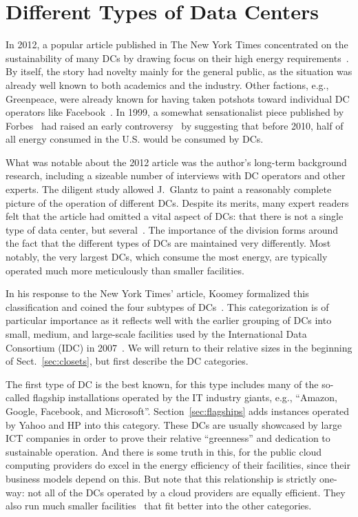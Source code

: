 \documentclass[officiallayout]{tktla}
\begin{document}
\section{Different Types of Data Centers}
\label{sec:types}

In 2012, a popular article published in The New York Times concentrated on the
sustainability of many DCs by drawing focus on their high energy
requirements~\cite{Glantz2012}. By itself, the story had novelty mainly for
the general public, as the situation was already well known to both academics
and the industry. Other factions, e.g., Greenpeace, were already known for
having taken potshots toward individual DC operators like
Facebook~\cite{Meikle2011,VanHorn2011}.  In 1999, a somewhat sensationalist
piece published by Forbes~\cite{Huber1999} had raised an early
controversy~\cite{EPA2007} by suggesting that before 2010, half of all
energy consumed in the U.S. would be consumed by DCs.

What was notable about the 2012 article was the author's long-term background
research, including a sizeable number of interviews with DC operators and
other experts. The diligent study allowed J.~Glantz to paint a reasonably
complete picture of the operation of different DCs. Despite its merits, many
expert readers felt that the article had omitted a vital aspect of DCs: that
there is not a single type of data center, but
several~\cite{Koomey2012a,Petersen2012,Woods2012}. The importance of the
division forms around the fact that the different types of DCs are maintained
very differently. Most notably, the very largest DCs, which consume the most
energy, are typically operated much more meticulously than smaller facilities.

In his response to the New York Times' article, Koomey formalized this
classification and coined the four subtypes of DCs~\cite{Koomey2012}. This
categorization is of particular importance as it reflects well with the
earlier grouping of DCs into small, medium, and large-scale facilities used by
the International Data Consortium (IDC) in
2007~\cite{Bailey2006,Bramfitt2012}. We will return to their relative sizes in
the beginning of Sect.~\ref{sec:closets}, but first describe the DC
categories.

The first type of DC is the best known, for this type includes many of the
so-called flagship installations operated by the IT industry giants, e.g.,
``Amazon, Google, Facebook, and Microsoft''. Section~\ref{sec:flagships} adds
instances operated by Yahoo and HP into this category. These DCs are usually
showcased by large ICT companies in order to prove their relative
``greenness'' and dedication to sustainable operation. And there is some truth
in this, for the public cloud computing providers do excel in the energy
efficiency of their facilities, since their business models depend on this.
But note that this relationship is strictly one-way: not all of the DCs
operated by a cloud providers are equally efficient. They also run much
smaller facilities~\cite{Google2011} that fit better into the other
categories.
\end{document}
